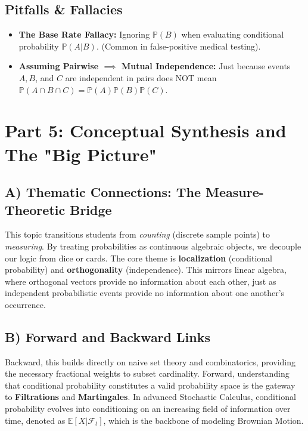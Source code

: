\documentclass[12pt]{article}
\theoremstyle{definition}
\theoremstyle{remark}
\begin{document}
\subsection{Pitfalls \& Fallacies}
\begin{itemize}
    \item \textbf{The Base Rate Fallacy:} Ignoring $\mathbb{P}(B)$ when evaluating conditional probability $\mathbb{P}(A|B)$. (Common in false-positive medical testing).
    \item \textbf{Assuming Pairwise $\implies$ Mutual Independence:} Just because events $A, B$, and $C$ are independent in pairs does NOT mean $\mathbb{P}(A \cap B \cap C) = \mathbb{P}(A)\mathbb{P}(B)\mathbb{P}(C)$.
\end{itemize}

\newpage
\section{Part 5: Conceptual Synthesis and The "Big Picture"}

\subsection{A) Thematic Connections: The Measure-Theoretic Bridge}
This topic transitions students from \textit{counting} (discrete sample points) to \textit{measuring}. By treating probabilities as continuous algebraic objects, we decouple our logic from dice or cards. The core theme is \textbf{localization} (conditional probability) and \textbf{orthogonality} (independence). This mirrors linear algebra, where orthogonal vectors provide no information about each other, just as independent probabilistic events provide no information about one another's occurrence.

\subsection{B) Forward and Backward Links}
Backward, this builds directly on naive set theory and combinatorics, providing the necessary fractional weights to subset cardinality. Forward, understanding that conditional probability constitutes a valid probability space is the gateway to \textbf{Filtrations} and \textbf{Martingales}. In advanced Stochastic Calculus, conditional probability evolves into conditioning on an increasing field of information over time, denoted as $\mathbb{E}[X | \mathcal{F}_t]$, which is the backbone of modeling Brownian Motion.
\end{document}
